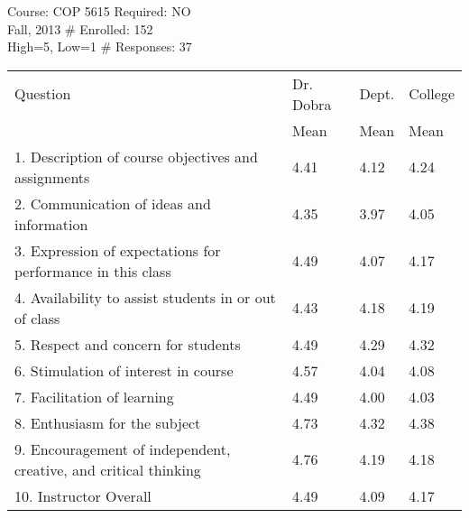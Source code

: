 \documentclass{article}
\begin{document}
\noindent Course: COP 5615 \hfill Required: NO \\
\noindent Fall, 2013 \hfill \# Enrolled: 152\\
High=5, Low=1 \hfill \# Responses: 37
\nopagebreak[4]
\begin{center}
  \begin{tabular}{llll}
    Question & Dr. Dobra & Dept. & College \\
    & Mean & Mean & Mean \\
    \hline
    1. Description of course objectives and assignments & 4.41 & 4.12 & 4.24 \\
    2. Communication of ideas and information & 4.35	&3.97	&4.05 \\
    3. Expression of expectations for performance in this class 
    & 4.49	&4.07	&4.17\\
    4. Availability to assist students in or out of class & 4.43	&4.18	&4.19\\
    5. Respect and concern for students & 4.49	&4.29	&4.32\\
    6. Stimulation of interest in course & 4.57	&4.04	&4.08 \\
    7. Facilitation of learning & 4.49	&4.00	&4.03 \\
    8. Enthusiasm for the subject & 4.73	&4.32	&4.38 \\
    9. Encouragement of independent, creative, and critical thinking & 4.76	&4.19	&4.18 \\
    \hline
    10. Instructor Overall & 4.49	&4.09	&4.17
  \end{tabular}
\end{center}
\end{document}
